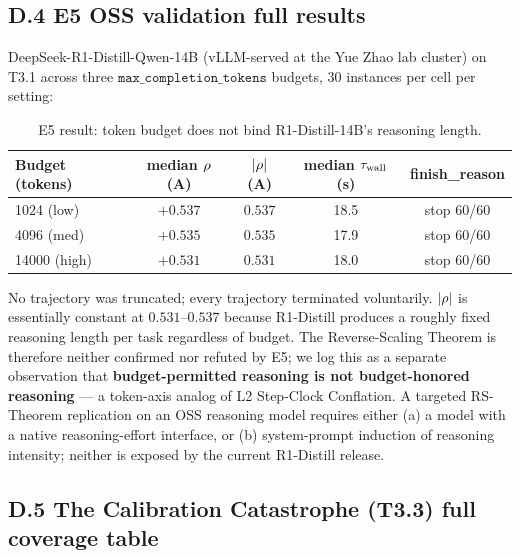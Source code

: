 \subsection*{D.4 E5 OSS validation full results}

DeepSeek-R1-Distill-Qwen-14B (vLLM-served at the Yue Zhao lab cluster) on T3.1 across three $\texttt{max\_completion\_tokens}$ budgets, 30 instances per cell per setting:

\begin{table}[h]
\centering
\small
\caption{E5 result: token budget does not bind R1-Distill-14B's reasoning length.}
\begin{tabular}{lcccc}
\toprule
Budget (tokens) & median $\rho$ (A) & $|\rho|$ (A) & median $\tau_{\mathrm{wall}}$ (s) & finish\_reason \\
\midrule
1024 (low) & $+0.537$ & $0.537$ & 18.5 & stop 60/60 \\
4096 (med) & $+0.535$ & $0.535$ & 17.9 & stop 60/60 \\
14000 (high) & $+0.531$ & $0.531$ & 18.0 & stop 60/60 \\
\bottomrule
\end{tabular}
\end{table}

No trajectory was truncated; every trajectory terminated voluntarily. $|\rho|$ is essentially constant at $0.531$--$0.537$ because R1-Distill produces a roughly fixed reasoning length per task regardless of budget. The Reverse-Scaling Theorem is therefore neither confirmed nor refuted by E5; we log this as a separate observation that \textbf{budget-permitted reasoning is not budget-honored reasoning} --- a token-axis analog of L2 Step-Clock Conflation. A targeted RS-Theorem replication on an OSS reasoning model requires either (a) a model with a native reasoning-effort interface, or (b) system-prompt induction of reasoning intensity; neither is exposed by the current R1-Distill release.

\subsection*{D.5 The Calibration Catastrophe (T3.3) full coverage table}

